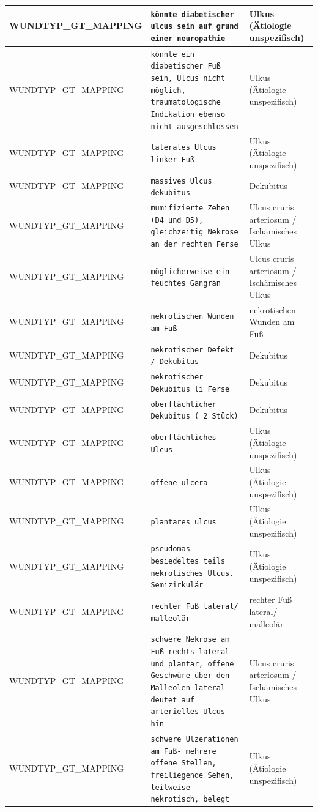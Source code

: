 \begin{longtable}{|p{3.5cm}|p{5cm}|p{6.5cm}|}
WUNDTYP\_GT\_MAPPING & \texttt{könnte diabetischer ulcus sein auf grund einer neuropathie} & Ulkus (Ätiologie unspezifisch) \\ \hline
WUNDTYP\_GT\_MAPPING & \texttt{könnte ein diabetischer Fuß sein, Ulcus  nicht möglich,
traumatologische Indikation ebenso nicht ausgeschlossen} & Ulkus (Ätiologie unspezifisch) \\ \hline
WUNDTYP\_GT\_MAPPING & \texttt{laterales Ulcus linker Fuß} & Ulkus (Ätiologie unspezifisch) \\ \hline
WUNDTYP\_GT\_MAPPING & \texttt{massives Ulcus dekubitus} & Dekubitus \\ \hline
WUNDTYP\_GT\_MAPPING & \texttt{mumifizierte Zehen (D4 und D5), gleichzeitig Nekrose an der rechten Ferse} & Ulcus cruris arteriosum / Ischämisches Ulkus \\ \hline
WUNDTYP\_GT\_MAPPING & \texttt{möglicherweise ein feuchtes Gangrän} & Ulcus cruris arteriosum / Ischämisches Ulkus \\ \hline
WUNDTYP\_GT\_MAPPING & \texttt{nekrotischen Wunden am Fuß} & nekrotischen Wunden am Fuß \\ \hline
WUNDTYP\_GT\_MAPPING & \texttt{nekrotischer Defekt / Dekubitus} & Dekubitus \\ \hline
WUNDTYP\_GT\_MAPPING & \texttt{nekrotischer Dekubitus li Ferse} & Dekubitus \\ \hline
WUNDTYP\_GT\_MAPPING & \texttt{oberflächlicher Dekubitus ( 2 Stück)} & Dekubitus \\ \hline
WUNDTYP\_GT\_MAPPING & \texttt{oberflächliches Ulcus} & Ulkus (Ätiologie unspezifisch) \\ \hline
WUNDTYP\_GT\_MAPPING & \texttt{offene ulcera} & Ulkus (Ätiologie unspezifisch) \\ \hline
WUNDTYP\_GT\_MAPPING & \texttt{plantares ulcus} & Ulkus (Ätiologie unspezifisch) \\ \hline
WUNDTYP\_GT\_MAPPING & \texttt{pseudomas besiedeltes teils nekrotisches Ulcus.
Semizirkulär} & Ulkus (Ätiologie unspezifisch) \\ \hline
WUNDTYP\_GT\_MAPPING & \texttt{rechter Fuß lateral/ malleolär} & rechter Fuß lateral/ malleolär \\ \hline
WUNDTYP\_GT\_MAPPING & \texttt{schwere Nekrose am Fuß rechts lateral und plantar, offene Geschwüre über den Malleolen lateral
deutet auf arterielles Ulcus hin} & Ulcus cruris arteriosum / Ischämisches Ulkus \\ \hline
WUNDTYP\_GT\_MAPPING & \texttt{schwere Ulzerationen am Fuß- mehrere offene Stellen, freiliegende Sehen, teilweise nekrotisch, belegt} & Ulkus (Ätiologie unspezifisch) \\ \hline

\end{longtable}
